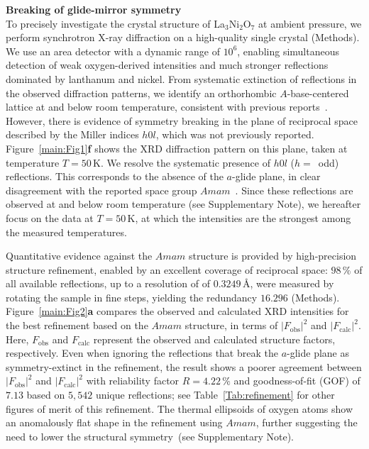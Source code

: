 \documentclass[aps,12pt,floatfix,longbibliography,a4paper]{revtex4-2}
\newcommand{\LNO}{La$_3$Ni$_2$O$_7$}
\begin{document}
\bigskip
\textbf{Breaking of glide-mirror symmetry}\\
To precisely investigate the crystal structure of \LNO{} at ambient pressure, we perform synchrotron X-ray diffraction on a high-quality single crystal (Methods). We use an area detector with a dynamic range of $10^6$, enabling simultaneous detection of weak oxygen-derived intensities and much stronger reflections dominated by lanthanum and nickel. From systematic extinction of reflections in the observed diffraction patterns, we identify an orthorhombic $A$-base-centered lattice at and below room temperature, consistent with previous reports~\cite{Zhang1994-vm,Taniguchi1995-lg,Ling2000-uz,Voronin2001-oc,Wang2024-qi,Wang2025-tg}. However, there is evidence of symmetry breaking in the plane of reciprocal space described by the Miller indices $h0l$, which was not previously reported. Figure~\ref{main:Fig1}\textbf{f} shows the XRD diffraction pattern on this plane, taken at temperature $T=50\,$K. We resolve the systematic presence of $h0l$ ($h=$~odd) reflections. This corresponds to the absence of the $a$-glide plane, in clear disagreement with the reported space group $Amam$~\cite{Zhang1994-vm,Taniguchi1995-lg,Ling2000-uz,Voronin2001-oc,Wang2024-qi,Wang2025-tg}. Since these reflections are observed at and below room temperature (see Supplementary Note), we hereafter focus on the data at $T=50\,$K, at which the intensities are the strongest among the measured temperatures.

Quantitative evidence against the $Amam$ structure is provided by high-precision structure refinement, enabled by an excellent coverage of reciprocal space: $98\,\%$ of all available reflections, up to a resolution of of $0.3249\,$\AA, were measured by rotating the sample in fine steps, yielding the redundancy $16.296$ (Methods). Figure~\ref{main:Fig2}\textbf{a} compares the observed and calculated XRD intensities for the best refinement based on the $Amam$ structure, in terms of  $|F_\mathrm{obs}|^2$ and $|F_\mathrm{calc}|^2$. Here, $F_\mathrm{obs}$ and $F_\mathrm{calc}$ represent the observed and calculated structure factors, respectively. Even when ignoring the reflections that break the $a$-glide plane as symmetry-extinct in the refinement, the result shows a poorer agreement between $|F_\mathrm{obs}|^2$ and $|F_\mathrm{calc}|^2$ with reliability factor $R = 4.22\,\%$ and goodness-of-fit (GOF) of $7.13$ based on $5,542$ unique reflections; see Table~\ref{Tab:refinement} for other figures of merit of this refinement. The thermal ellipsoids of oxygen atoms show an anomalously flat shape in the refinement using $Amam$, further suggesting the need to lower the structural symmetry~(see Supplementary Note).
\end{document}

